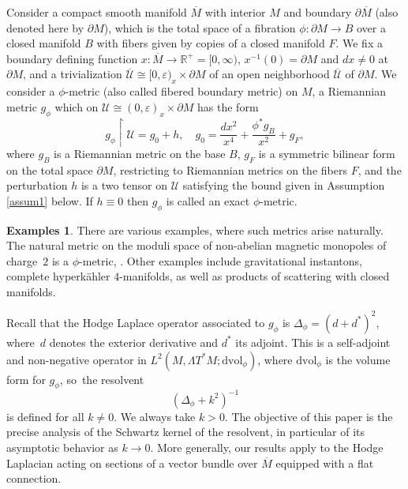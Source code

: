 \documentclass[JEP,XML,SOM,Unicode,NoFloatCountersInSection,published]{cedram}
\theoremstyle{plain}
\theoremstyle{definition}
\newtheorem{Exs}[Th]{Examples}
\newcommand{\R}{{\mathbb{R}}}
\newcommand{\Umathbar}{{\overline{\mathscr{U}}}}
\newcommand{\dvol}{\mathrm{dvol}}
\newcommand{\dM}{{\partial M}}
\newcommand{\Mbar}{{\overline{M}}}\let\M\Mbar
\let\eps\varepsilon
\begin{document}
Consider a compact smooth manifold $\Mbar$
with interior $M$ and boundary $\partial \Mbar$
(also denoted here by $\partial M$),
which is the total space of a fibration
$\phi: \partial M \to B$ over a closed manifold $B$ with fibers given by
copies of a closed manifold $F$. We fix a boundary defining function
$x:\Mbar\to\R^+=[0,\infty)$, \ie $x^{-1}(0)=\dM$ and $dx\neq0$ at $\dM$, and a trivialization $\Umathbar\cong [0,\eps)_x\times\dM$ of an open
neighborhood $\Umathbar$ of $\partial M$. We consider a $\phi$-metric (also called fibered boundary metric) on $M$, \ie a Riemannian metric $g_\phi$ which on $\mathscr{U} \cong (0,\varepsilon)_x\times\partial M$ has the form
\begin{equation}\label{g-phi-def}
g_{\phi} \restriction \mathscr{U} = g_0 + h,\quad g_0=\frac{dx^{2}}{x^4} + \frac{\phi^{*}g_{B}}{x^{2}} + g_{F},
\end{equation}
where $g_{B}$ is a Riemannian metric on the base $B$, $g_{F}$ is a symmetric bilinear form on the
total space $\partial M$, restricting to Riemannian metrics on the fibers $F$, and the perturbation $h$ is a two tensor on $\mathscr{U}$ satisfying the bound given in Assumption \ref{assum1} below.
If $h\equiv 0$ then
$g_\phi$ is called an exact $\phi$-metric.

\begin{Exs}
There are various examples, where such metrics arise naturally.
The natural metric on the moduli space of non-abelian magnetic monopoles
of charge~$2$ is a $\phi$-metric, \cf \cite{gravi-ins, kottke-singer, fritsch}. Other examples include
gravitational instantons, \ie complete hyperkähler $4$-manifolds, as well as products
of scattering with closed manifolds.
\end{Exs}

Recall that the Hodge Laplace operator associated to $g_\phi$ is $\Delta_{\phi} = (d+d^*)^2$,
where~$d$ denotes the exterior derivative and
$d^*$ its adjoint. This is a self-adjoint and non-negative operator in $L^2(M,\Lambda T^*M; \dvol_\phi)$,
where $\dvol_\phi$ is the volume form for $g_\phi$, so~the resolvent
\[
(\Delta_{\phi}+k^2)^{-1}
\]
is defined for all $k\neq0$. We always take $k>0$. The objective of this paper is
the precise analysis of the Schwartz kernel of the resolvent, in particular of its asymptotic behavior as $k\to0$.
More generally, our results apply to the Hodge Laplacian acting on sections of a vector bundle over $\Mbar$ equipped with a flat connection.
\end{document}
